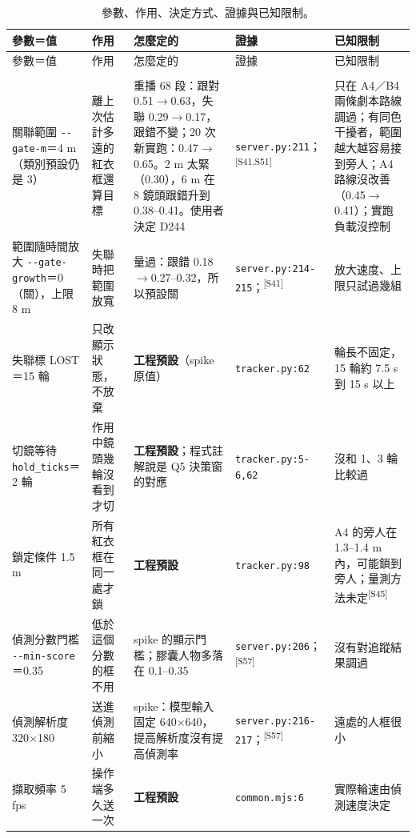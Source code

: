 \documentclass[11pt,a4paper]{article}
\newcommand{\src}[1]{\textsuperscript{\scriptsize[#1]}}
\newcommand{\code}[1]{\texttt{\detokenize{#1}}}
\begin{document}
\begin{footnotesize}
\renewcommand{\code}[1]{{\def\UrlBreaks{\do\.\do\_\do\:\do\-\do\/}\urlstyle{tt}\nolinkurl{#1}}}
\begin{longtable}{>{\raggedright\arraybackslash}p{2.6cm} >{\raggedright\arraybackslash}p{2.6cm} >{\raggedright\arraybackslash}p{4.3cm} >{\raggedright\arraybackslash}p{3.0cm} >{\raggedright\arraybackslash}p{2.6cm}}
\caption{參數、作用、決定方式、證據與已知限制。}\label{tab:v4-params}\\
\toprule
參數＝值 & 作用 & 怎麼定的 & 證據 & 已知限制 \\
\midrule
\endfirsthead
\toprule
參數＝值 & 作用 & 怎麼定的 & 證據 & 已知限制 \\
\midrule
\endhead
\multicolumn{5}{l}{\textbf{即時模式：規則追蹤}} \\
關聯範圍 \code{--gate-m}＝4 m（類別預設仍是 3） & 離上次估計多遠的紅衣框還算目標 & 重播 68 段：跟對 0.51$\to$0.63，失聯 0.29$\to$0.17，跟錯不變；20 次新實跑：0.47$\to$0.65。2 m 太緊（0.30），6 m 在 8 鏡頭跟錯升到 0.38--0.41。使用者決定 D244 & \code{server.py:211}；\src{S41,S51} & 只在 A4／B4 兩條劇本路線調過；有同色干擾者，範圍越大越容易接到旁人；A4 路線沒改善（0.45$\to$0.41）；實跑負載沒控制 \\
範圍隨時間放大 \code{--gate-growth}＝0（關），上限 8 m & 失聯時把範圍放寬 & 量過：跟錯 0.18$\to$0.27--0.32，所以預設關 & \code{server.py:214-215}；\src{S41} & 放大速度、上限只試過幾組 \\
失聯標 LOST＝15 輪 & 只改顯示狀態，不放棄 & \textbf{工程預設}（spike 原值） & \code{tracker.py:62} & 輪長不固定，15 輪約 7.5 s 到 15 s 以上 \\
切鏡等待 \code{hold_ticks}＝2 輪 & 作用中鏡頭幾輪沒看到才切 & \textbf{工程預設}；程式註解說是 Q5 決策窗的對應 & \code{tracker.py:5-6,62} & 沒和 1、3 輪比較過 \\
鎖定條件 1.5 m & 所有紅衣框在同一處才鎖 & \textbf{工程預設} & \code{tracker.py:98} & A4 的旁人在 1.3--1.4 m 內，可能鎖到旁人；量測方法未定\src{S45} \\
偵測分數門檻 \code{--min-score}＝0.35 & 低於這個分數的框不用 & spike 的顯示門檻；膠囊人物多落在 0.1--0.35 & \code{server.py:206}；\src{S57} & 沒有對追蹤結果調過 \\
偵測解析度 320$\times$180 & 送進偵測前縮小 & spike：模型輸入固定 640$\times$640，提高解析度沒有提高偵測率 & \code{server.py:216-217}；\src{S57} & 遠處的人框很小 \\
擷取頻率 5 fps & 操作端多久送一次 & \textbf{工程預設} & \code{common.mjs:6} & 實際輪速由偵測速度決定 \\

\end{longtable}
\end{footnotesize}
\end{document}
